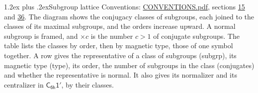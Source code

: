 \documentclass[10pt,a4paper]{article}
\makeatletter
\renewcommand\section{\@startsection{section}{1}{\z@}{-3ex plus -1ex minus -.2ex}%
  {1.2ex plus .2ex}{\normalfont\large\sffamily\bfseries\color{parttitle}}}
\numberwithin{equation}{section}
\newcommand{\grp}[1]{\mathsf{#1}}
\makeatother
\begin{document}
\section{Subgroup lattice}\label{s:subgroups}
Conventions: \href{../../CONVENTIONS.pdf}{CONVENTIONS.pdf}, sections \href{../../../rotation/CONVENTIONS.pdf\#conv.15}{15} and \href{../../CONVENTIONS.pdf\#conv.36}{36}.
The diagram shows the conjugacy classes of subgroups, each joined to the classes of its maximal subgroups, and the orders increase upward. \label{n:index.conjugates.c}A normal subgroup is framed, and ${\times}c$ is the number $c > 1$ of conjugate subgroups. The table lists the classes by order, then by magnetic type, those of one symbol together. \label{n:head.subgroup}\label{n:head.magnetic.type}\label{n:head.order}\label{n:head.conjugates}\label{n:head.normal}A row gives the representative of a class of subgroups (subgrp), its magnetic type (type), its order, the number of subgroups in the class (conjugates) and whether the representative is normal. \label{n:head.normalizer}\label{n:head.centralizer}It also gives its normalizer and its centralizer in $\grp{C_{6h}1'}$, by their classes. 
\end{document}
